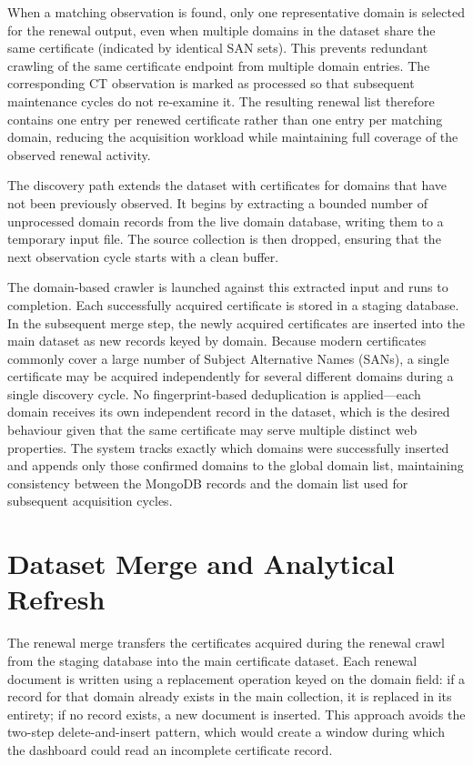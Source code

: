When a matching observation is found, only one representative domain is
selected for the renewal output, even when multiple domains in the dataset
share the same certificate (indicated by identical SAN sets). This prevents
redundant crawling of the same certificate endpoint from multiple domain
entries. The corresponding CT observation is marked as processed so that
subsequent maintenance cycles do not re-examine it. The resulting renewal
list therefore contains one entry per renewed certificate rather than one
entry per matching domain, reducing the acquisition workload while
maintaining full coverage of the observed renewal activity.

The discovery path extends the dataset with certificates for domains that
have not been previously observed. It begins by extracting a bounded number
of unprocessed domain records from the live domain database, writing them to
a temporary input file. The source collection is then dropped, ensuring that
the next observation cycle starts with a clean buffer.

The domain-based crawler is launched against this extracted input and runs to
completion. Each successfully acquired certificate is stored in a staging
database. In the subsequent merge step, the newly acquired certificates are
inserted into the main dataset as new records keyed by domain. Because
modern certificates commonly cover a large number of Subject Alternative
Names (SANs), a single certificate may be acquired independently for several
different domains during a single discovery cycle. No fingerprint-based
deduplication is applied---each domain receives its own independent record
in the dataset, which is the desired behaviour given that the same
certificate may serve multiple distinct web properties. The system tracks
exactly which domains were successfully inserted and appends only those
confirmed domains to the global domain list, maintaining consistency between
the MongoDB records and the domain list used for subsequent acquisition
cycles.

\section{Dataset Merge and Analytical Refresh}
\label{sec:ct-precompute-integration}

The renewal merge transfers the certificates acquired during the renewal
crawl from the staging database into the main certificate dataset. Each
renewal document is written using a replacement operation keyed on the
domain field: if a record for that domain already exists in the main
collection, it is replaced in its entirety; if no record exists, a new
document is inserted. This approach avoids the two-step delete-and-insert
pattern, which would create a window during which the dashboard could read an
incomplete certificate record.

